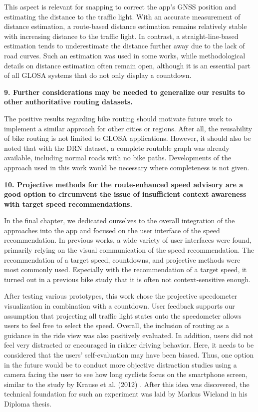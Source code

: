 This aspect is relevant for snapping to correct the app's GNSS position and estimating the distance to the traffic light. With an accurate measurement of distance estimation, a route-based distance estimation remains relatively stable with increasing distance to the traffic light. In contrast, a straight-line-based estimation tends to underestimate the distance further away due to the lack of road curves. Such an estimation was used in some works, while methodological details on distance estimation often remain open, although it is an essential part of all GLOSA systems that do not only display a countdown.

\textbf{\color{cidarkblue}9. Further considerations may be needed to generalize our results to other authoritative routing datasets.} 

The positive results regarding bike routing should motivate future work to implement a similar approach for other cities or regions. After all, the reusability of bike routing is not limited to GLOSA applications. However, it should also be noted that with the DRN dataset, a complete routable graph was already available, including normal roads with no bike paths. Developments of the approach used in this work would be necessary where completeness is not given.

\textbf{\color{cidarkblue}10. Projective methods for the route-enhanced speed advisory are a good option to circumvent the issue of insufficient context awareness with target speed recommendations.} 

In the final chapter, we dedicated ourselves to the overall integration of the approaches into the app and focused on the user interface of the speed recommendation. In previous works, a wide variety of user interfaces were found, primarily relying on the visual communication of the speed recommendation. The recommendation of a target speed, countdowns, and projective methods were most commonly used. Especially with the recommendation of a target speed, it turned out in a previous bike study that it is often not context-sensitive enough. 

After testing various prototypes, this work chose the projective speedometer visualization in combination with a countdown. User feedback supports our assumption that projecting all traffic light states onto the speedometer allows users to feel free to select the speed. Overall, the inclusion of routing as a guidance in the ride view was also positively evaluated. In addition, users did not feel very distracted or encouraged in riskier driving behavior. Here, it needs to be considered that the users' self-evaluation may have been biased. Thus, one option in the future would be to conduct more objective distraction studies using a camera facing the user to see how long cyclists focus on the smartphone screen, similar to the study by Krause et al. (2012) \cite{krause_traffic_2012}. After this idea was discovered, the technical foundation for such an experiment was laid by Markus Wieland \cite{wieland_2023} in his Diploma thesis.

